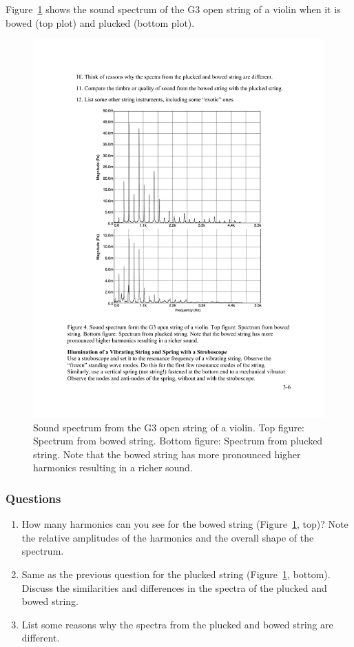 \documentclass[11pt]{NSF}
\def\ben{\begin{enumerate}}
\def\een{\end{enumerate}}
\def\i{\item{}}
\begin{document}
Figure~\ref{f:4} shows the sound  spectrum of the G3 open string of a violin
when it is bowed (top plot) and plucked (bottom plot).
%
\begin{figure}[hbtp] 
\begin{center} 
\includegraphics[width=.7\textwidth]{fig3_4}
\caption{Sound spectrum from the G3 open string of a violin. 
Top figure: Spectrum from bowed string. 
Bottom figure: Spectrum from plucked string. 
Note that the bowed string has more pronounced higher harmonics 
resulting in a richer sound.}
\label{f:4} 
\end{center} 
\end{figure}
%

\subsubsection*{Questions}
\ben

\i How many harmonics can you see for the bowed string (Figure~\ref{f:4}, top)? 
Note the relative amplitudes of the harmonics and the 
overall shape of the spectrum.

\i Same as the previous question for the plucked string (Figure~\ref{f:4}, bottom).
Discuss the similarities and differences in the spectra of the plucked and bowed string. 

\i List some reasons why the spectra from the plucked and bowed string are different.

\een
\end{document}
